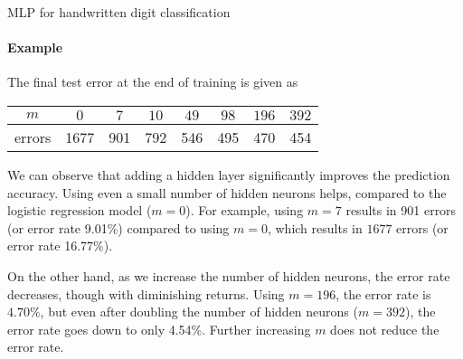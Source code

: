 \begin{frame}{MLP for handwritten digit classification}
\framesubtitle{Example}

The final test error at the end of training
    is given as
    \begin{center}
        \begin{tabular}{|c||c|c|c|c|c|c|c|}
            \hline
            $m$ & $0$ & $7$ & $10$ & $49$ & $98$ & $196$ &
            $392$\\
            \hline
            errors & 1677 & 901 & 792 & 546 & 495 & 470 & 454\\
            \hline
        \end{tabular}
    \end{center}

\medskip

    We can observe that adding a hidden layer significantly improves the
    prediction accuracy. Using even a small number of hidden neurons helps,
    compared to the logistic regression model ($m=0$).
    For example, using $m=7$ results in 901 errors (or error rate 9.01\%)
    compared to using $m=0$, which results in $1677$ errors (or error rate
    16.77\%).

\medskip

    On the other hand, as we increase the number of hidden neurons, the
    error rate decreases, though with diminishing returns. Using $m=196$,
    the error rate is $4.70\%$, but even after doubling the number of
    hidden neurons ($m=392$), the error rate goes down to only 4.54\%. 
    Further increasing $m$ does not reduce the error rate.
\end{frame}
%
%
%
